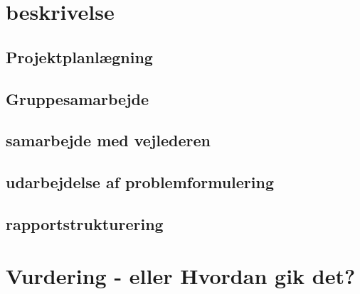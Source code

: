 



\section{beskrivelse}

\subsection{Projektplanlægning}


\subsection{Gruppesamarbejde}


\subsection{samarbejde med vejlederen}


\subsection{udarbejdelse af problemformulering}


\subsection{rapportstrukturering}


\section{Vurdering - eller Hvordan gik det?}














